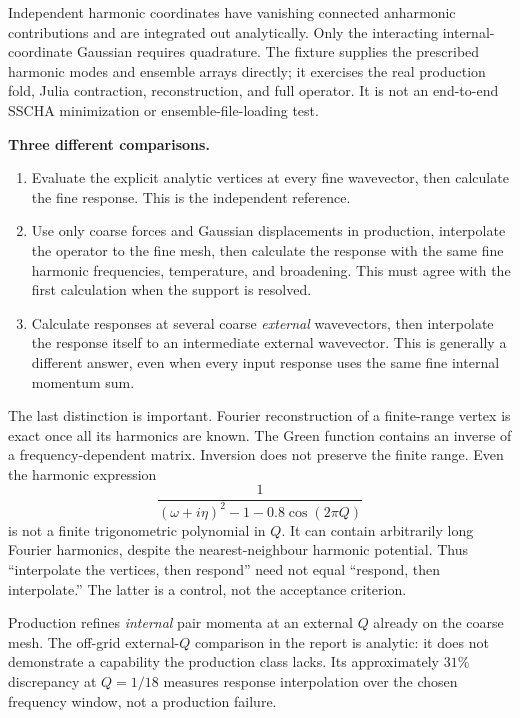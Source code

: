 \documentclass[11pt,a4paper]{article}
\begin{document}
Independent harmonic coordinates have vanishing connected anharmonic
contributions and are integrated out analytically. Only the interacting
internal-coordinate Gaussian requires quadrature. The fixture supplies the
prescribed harmonic modes and ensemble arrays directly; it exercises the
real production fold, Julia contraction, reconstruction, and full operator.
It is not an end-to-end SSCHA minimization or ensemble-file-loading test.

\textbf{Three different comparisons.}
\begin{enumerate}
\item Evaluate the explicit analytic vertices at every fine wavevector,
then calculate the fine response. This is the independent reference.
\item Use only coarse forces and Gaussian displacements in production,
interpolate the operator to the fine mesh, then calculate the response with
the same fine harmonic frequencies, temperature, and broadening.
This must agree with the first calculation when the support is resolved.
\item Calculate responses at several coarse \emph{external} wavevectors,
then interpolate the response itself to an intermediate external wavevector.
This is generally a different answer, even when every input response uses
the same fine internal momentum sum.
\end{enumerate}

The last distinction is important. Fourier reconstruction of a finite-range
vertex is exact once all its harmonics are known. The Green function contains
an inverse of a frequency-dependent matrix. Inversion does not preserve the
finite range. Even the harmonic expression
\begin{equation}
 \frac{1}{(\omega+i\eta)^2-1-0.8\cos(2\pi Q)}
\end{equation}
is not a finite trigonometric polynomial in $Q$. It can contain arbitrarily
long Fourier harmonics, despite the nearest-neighbour harmonic potential.
Thus ``interpolate the vertices, then respond'' need not equal ``respond,
then interpolate.'' The latter is a control, not the acceptance criterion.

Production refines \emph{internal} pair momenta at an external $Q$ already
on the coarse mesh. The off-grid external-$Q$ comparison in the report is
analytic: it does not demonstrate a capability the production class lacks.
Its approximately $31\%$ discrepancy at $Q=1/18$ measures response
interpolation over the chosen frequency window, not a production failure.
\end{document}
